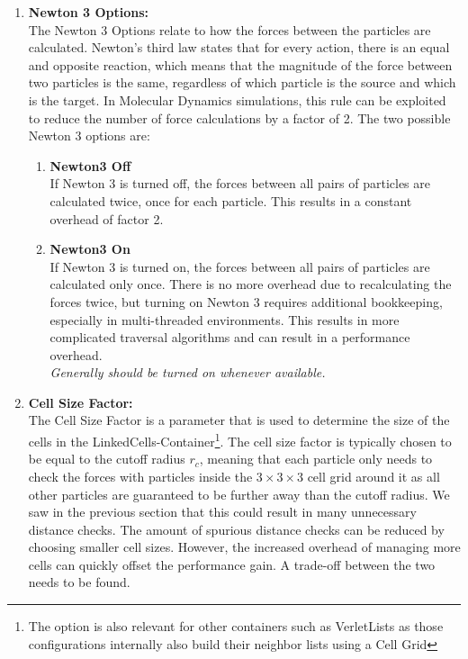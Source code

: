 \begin{enumerate}[label=\textbf{\arabic*.}]
      \item \textbf{Newton 3 Options:} \\
            The Newton 3 Options relate to how the forces between the particles are calculated. Newton's third law states that for every action, there is an equal and opposite reaction, which means that the magnitude of the force between two particles is the same, regardless of which particle is the source and which is the target. In Molecular Dynamics simulations, this rule can be exploited to reduce the number of force calculations by a factor of 2. The two possible Newton 3 options are:
            \begin{enumerate}
                  \item \textbf{Newton3 Off} \\
                        If Newton 3 is turned off, the forces between all pairs of particles are calculated twice, once for each particle. This results in a constant overhead of factor 2.

                  \item \textbf{Newton3 On} \\
                        If Newton 3 is turned on, the forces between all pairs of particles are calculated only once. There is no more overhead due to recalculating the forces twice, but turning on Newton 3 requires additional bookkeeping, especially in multi-threaded environments. This results in more complicated traversal algorithms and can result in a performance overhead.\\
                        \textit{Generally should be turned on whenever available.}
            \end{enumerate}

      \item \textbf{Cell Size Factor:} \\
            The Cell Size Factor is a parameter that is used to determine the size of the cells in the LinkedCells-Container\footnote{The option is also relevant for other containers such as VerletLists as those configurations internally also build their neighbor lists using a Cell Grid}. The cell size factor is typically chosen to be equal to the cutoff radius $r_c$, meaning that each particle only needs to check the forces with particles inside the $3\times3\times3$ cell grid around it as all other particles are guaranteed to be further away than the cutoff radius. We saw in the previous section that this could result in many unnecessary distance checks. The amount of spurious distance checks can be reduced by choosing smaller cell sizes. However, the increased overhead of managing more cells can quickly offset the performance gain. A trade-off between the two needs to be found.

\end{enumerate}

